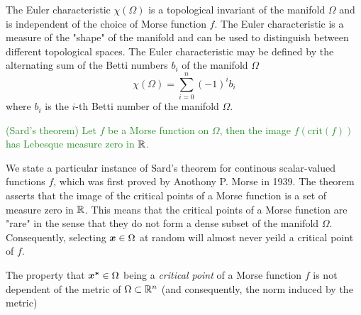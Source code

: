 \documentclass[10pt]{article}
\begin{document}
\begin{remark}
    The Euler characteristic $\chi(\Omega)$ is a topological invariant of the manifold $\Omega$
    and is independent of the choice of Morse function $f$.
    The Euler characteristic is a measure of the "shape" of the manifold and can be used to
    distinguish between different topological spaces.
    The Euler characteristic may be defined by the alternating sum of the Betti numbers
    $b_i$ of the manifold $\Omega$
    $$
        \chi(\Omega) = \sum_{i=0}^n (-1)^i b_i
    $$
    where $b_i$ is the $i$-th Betti number of the manifold $\Omega$.
\end{remark}

\begin{theorem}
    \textcolor{ForestGreen}{
        (Sard's theorem) Let $f$ be a Morse function on $\Omega$, then
        the image $f(\text{crit}(f))$ has Lebesque measure zero in $\mathbb{R}$.
    }
\end{theorem}

\begin{remark}
    We state a particular instance of Sard's theorem for continous scalar-valued functions $f$,
    which was first proved by Anothony P. Morse in 1939.
    The theorem asserts that the image of the critical points of a Morse function is a set 
    of measure zero in $\mathbb{R}$. This means that the critical points of a Morse function are "rare" in the sense that they
    do not form a dense subset of the manifold $\Omega$.
    Consequently, selecting $\bm{x} \in \Omega$ at random will almost never yeild a critical
    point of $f$.
\end{remark}

\begin{remark}
    The property that $\bm{x^*} \in \Omega$ being a \emph{critical point} of a Morse function $f$ is
    not dependent of the metric of $\Omega \subset \mathbb{R}^n$ (and consequently, the norm induced by the metric)
\end{remark}




\end{document}
